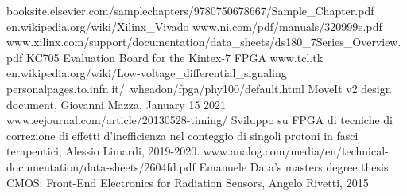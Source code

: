\begin{thebibliography}{00}
	booksite.elsevier.com/samplechapters/9780750678667/Sample\_Chapter.pdf
	en.wikipedia.org/wiki/Xilinx\_Vivado
	www.ni.com/pdf/manuals/320999e.pdf
	www.xilinx.com/support/documentation/data\_sheets/ds180\_7Series\_Overview.pdf
	KC705 Evaluation Board for the Kintex-7 FPGA	
	www.tcl.tk
	en.wikipedia.org/wiki/Low-voltage\_differential\_signaling
	personalpages.to.infn.it/~wheadon/fpga/phy100/default.html
	MoveIt v2 design document, Giovanni Mazza, January 15 2021
	www.eejournal.com/article/20130528-timing/
	Sviluppo su FPGA di tecniche di correzione di effetti d'inefficienza nel conteggio di singoli protoni in fasci terapeutici, Alessio Limardi, 2019-2020.
	www.analog.com/media/en/technical-documentation/data-sheets/2604fd.pdf
	Emanuele Data's masters degree thesis
	 CMOS: Front-End Electronics for Radiation Sensors, Angelo Rivetti, 2015
	
	
\end{thebibliography}
